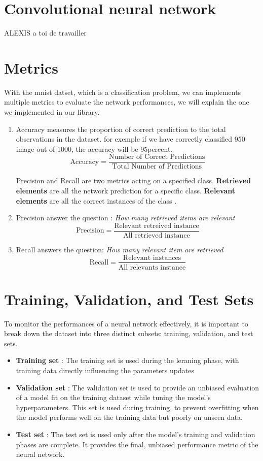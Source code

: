 \documentclass[a4paper, twocolumn, twoside]{article}
\begin{document}
	\section{Convolutional neural network}
	ALEXIS a toi de travailler

	\section{Metrics}
	With the mnist datset, which is a classification problem, we can implements multiple metrics
	to evaluate the network performances, we will explain the one we implemented in our library.

	\begin{enumerate}
		\item Accuracy measures the proportion of correct prediction to the total observations in the dataset.
		for exemple if we have correctly classified 950 image out of 1000, the accuracy will be 95percent.
		$$
		\text{Accuracy} = \frac{\text{Number of Correct Predictions}}{\text{Total Number of Predictions}}
		$$

		Precision and Recall are two metrics acting on a specified class.
		\textbf{Retrieved elements} are all the network prediction for a specific class.
		\textbf{Relevant elements} are all the correct instances of 
		the class \cite{wiki_precision_recall}.

		\item Precision answer the question : \textit{How many retrieved items are relevant}
		$$
		\text{Precision} = \frac{\text{Relevant retreived instance}}{\text{All retrieved instance}}
		$$
		\item Recall answers the question: \textit{How many relevant item are retrieved}
		$$
		\text{Recall} = \frac{\text{Relevant instances}}{\text{All relevants instance}}
		$$
	\end{enumerate}

	\section{Training, Validation, and Test Sets}
	To monitor the performances of a neural network effectively,
	it is important to break down the dataset into three distinct subsets:
	training, validation, and test sets.

	\begin{itemize}
\item{\textbf{Training set}} : The training set is used during the leraning phase,
	with training data directly influencing the parameters updates
\item{\textbf{Validation set}} : The validation set is used to provide an unbiased evaluation of a model fit
	on the training dataset while tuning the model's hyperparameters.
	This set is used during training, to prevent overfitting when the model performs well on the training data
	but poorly on unseen data.
\item{\textbf{Test set}} :	The test set is used only after the model's training and validation phases are complete.
	It provides the final, unbiased performance metric of the neural network.
	\end{itemize}
\end{document}
